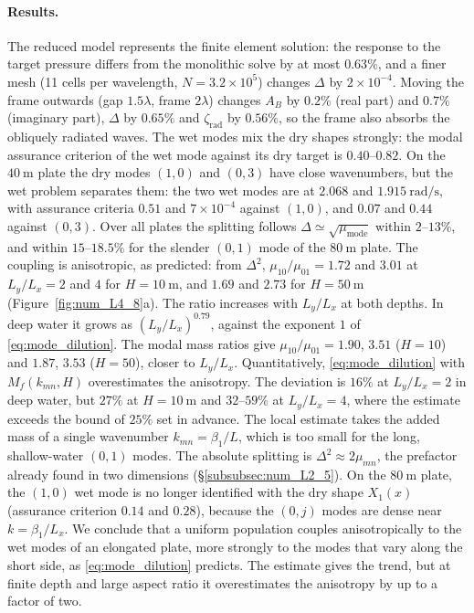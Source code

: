 {\paragraph{Results.} The reduced model represents the finite element solution: the response to the target pressure differs from the monolithic solve by at most $0.63\%$, and a finer mesh (11 cells per wavelength, $N=3.2\times10^5$) changes $\Delta$ by $2\times10^{-4}$. Moving the frame outwards (gap $1.5\lambda$, frame $2\lambda$) changes $A_B$ by $0.2\%$ (real part) and $0.7\%$ (imaginary part), $\Delta$ by $0.65\%$ and $\zeta_\mathrm{rad}$ by $0.56\%$, so the frame also absorbs the obliquely radiated waves. The wet modes mix the dry shapes strongly: the modal assurance criterion of the wet mode against its dry target is $0.40$--$0.82$. On the $40~\si{\meter}$ plate the dry modes $(1,0)$ and $(0,3)$ have close wavenumbers, but the wet problem separates them: the two wet modes are at $2.068$ and $1.915~\si{\radian\per\second}$, with assurance criteria $0.51$ and $7\times10^{-4}$ against $(1,0)$, and $0.07$ and $0.44$ against $(0,3)$. Over all plates the splitting follows $\Delta\simeq\sqrt{\mu_\mathrm{mode}}$ within $2$--$13\%$, and within $15$--$18.5\%$ for the slender $(0,1)$ mode of the $80~\si{\meter}$ plate. The coupling is anisotropic, as predicted: from $\Delta^2$, $\mu_{10}/\mu_{01}=1.72$ and $3.01$ at $L_y/L_x=2$ and $4$ for $H=10~\si{\meter}$, and $1.69$ and $2.73$ for $H=50~\si{\meter}$ (Figure~\ref{fig:num_L4_8}a). The ratio increases with $L_y/L_x$ at both depths. In deep water it grows as $(L_y/L_x)^{0.79}$, against the exponent $1$ of \eqref{eq:mode_dilution}. The modal mass ratios give $\mu_{10}/\mu_{01}=1.90$, $3.51$ ($H=10$) and $1.87$, $3.53$ ($H=50$), closer to $L_y/L_x$. Quantitatively, \eqref{eq:mode_dilution} with $M_f(k_{mn},H)$ overestimates the anisotropy. The deviation is $16\%$ at $L_y/L_x=2$ in deep water, but $27\%$ at $H=10~\si{\meter}$ and $32$--$59\%$ at $L_y/L_x=4$, where the estimate exceeds the bound of $25\%$ set in advance. The local estimate takes the added mass of a single wavenumber $k_{mn}=\beta_1/L$, which is too small for the long, shallow-water $(0,1)$ modes. The absolute splitting is $\Delta^2\approx2\mu_{mn}$, the prefactor already found in two dimensions (\S\ref{subsubsec:num_L2_5}). On the $80~\si{\meter}$ plate, the $(1,0)$ wet mode is no longer identified with the dry shape $X_1(x)$ (assurance criterion $0.14$ and $0.28$), because the $(0,j)$ modes are dense near $k=\beta_1/L_x$. We conclude that a uniform population couples anisotropically to the wet modes of an elongated plate, more strongly to the modes that vary along the short side, as \eqref{eq:mode_dilution} predicts. The estimate gives the trend, but at finite depth and large aspect ratio it overestimates the anisotropy by up to a factor of two.

}
